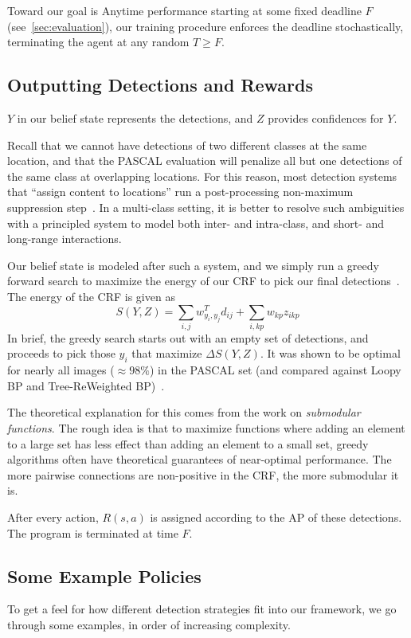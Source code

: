 Toward our goal is Anytime performance starting at some fixed deadline $F$ (see~\autoref{sec:evaluation}), our training procedure enforces the deadline stochastically, terminating the agent at any random $T \geq F$.

\subsection{Outputting Detections and Rewards} \label{sec:rewards}
$Y$ in our belief state represents the detections, and $Z$ provides confidences for $Y$.

Recall that we cannot have detections of two different classes at the same location, and that the PASCAL evaluation will penalize all but one detections of the same class at overlapping locations.
For this reason, most detection systems that ``assign content to locations'' run a post-processing non-maximum suppression step~\cite{Felzenszwalb2010a}.
In a multi-class setting, it is better to resolve such ambiguities with a principled system to model both inter- and intra-class, and short- and long-range interactions.

Our belief state is modeled after such a system, and we simply run a greedy forward search to maximize the energy of our CRF to pick our final detections~\cite{Desai2009}.
The energy of the CRF is given as
\begin{equation}
  S(Y,Z) = \sum_{i,j} w_{y_i,y_j}^T d_{ij} + \sum_{i,kp} w_{kp} z_{ikp}
\end{equation}
In brief, the greedy search starts out with an empty set of detections, and proceeds to pick those $y_i$ that maximize $\Delta S(Y,Z)$.
It was shown to be optimal for nearly all images ($\approx98\%$) in the PASCAL set (and compared against Loopy BP and Tree-ReWeighted BP)~\cite{Desai2009}.

The theoretical explanation for this comes from the work on \emph{submodular functions}.
The rough idea is that to maximize functions where adding an element to a large set has less effect than adding an element to a small set, greedy algorithms often have theoretical guarantees of near-optimal performance.
The more pairwise connections are non-positive in the CRF, the more submodular it is.

After every action, $R(s,a)$ is assigned according to the AP of these detections.
The program is terminated at time $F$.

\subsection{Some Example Policies}
To get a feel for how different detection strategies fit into our framework, we go through some examples, in order of increasing complexity.

